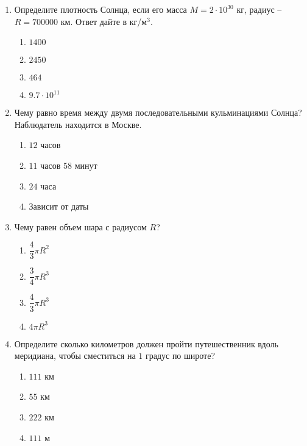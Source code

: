 \documentclass[12pt]{article}
\begin{document}
\begin{enumerate}[resume]
	\item Определите плотность Солнца, если его масса $M = 2\cdot10^{30}$ кг, радиус -- $R = 700000$ км. Ответ дайте в кг/м$^3$.
	\begin{multicols}{2}
		\begin{enumerate}[label=\textbf{\Alph*.}]
			\item{$1400$} \item{$2450$}
			\item{$464$} \item{$9.7\cdot10^{11}$} 
		\end{enumerate}	
	\end{multicols}

	\item Чему равно время между двумя последовательными кульминациями Солнца? Наблюдатель находится в Москве.
	\begin{multicols}{2}
		\begin{enumerate}[label=\textbf{\Alph*.}]
			\item{$12$ часов} \item{$11$ часов $58$ минут}
			\item{$24$ часа} \item{Зависит от даты} 
		\end{enumerate}	
	\end{multicols}

	\item Чему равен объем шара с радиусом $R$?
	\begin{multicols}{2}
		\begin{enumerate}[label=\textbf{\Alph*.}]
			\item{$\dfrac{4}{3}\pi R^2$} \item{$\dfrac{3}{4}\pi R^3$}
			\item{$\dfrac{4}{3}\pi R^3$} \item{$4\pi R^3$} 
		\end{enumerate}
	\end{multicols}

	\item Определите сколько километров должен пройти путешественник вдоль меридиана, чтобы сместиться на $1$ градус по широте?
	\begin{multicols}{2}
		\begin{enumerate}[label=\textbf{\Alph*.}]
			\item{$111$ км} \item{$55$ км}
			\item{$222$ км} \item{$111$ м} 
		\end{enumerate}
	\end{multicols}


\end{enumerate}
\end{document}
